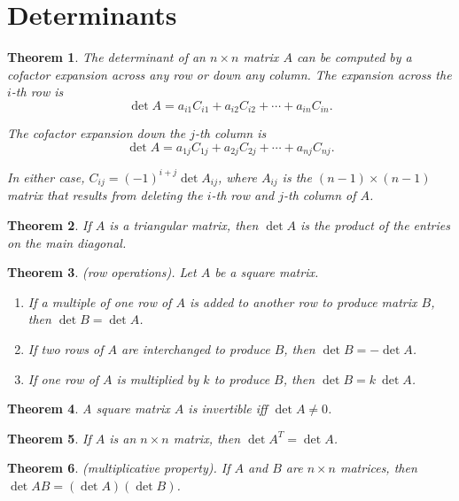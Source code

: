 \documentclass{article}
\theoremstyle{plain}
\newtheorem{thm}{Theorem}[section]
\theoremstyle{definition}
\theoremstyle{remark}
\begin{document}
\section{Determinants}

\begin{thm}
    The determinant of an \(n\times n\) matrix \(A\) can be computed by a cofactor expansion across any row or down any column. The expansion across the \(i\)-th row is 
    \[
        \det A=a_{i1}C_{i1}+a_{i2}C_{i2}+\cdots+a_{in}C_{in}.
    \] 
    
    The cofactor expansion down the \(j\)-th column is 
    \[
        \det A=a_{1j}C_{1j}+a_{2j}C_{2j}+\cdots+a_{nj}C_{nj}.
    \]

    In either case, \(C_{ij}=(-1)^{i+j}\det A_{ij}\), where \(A_{ij}\) is the \((n-1)\times(n-1)\) matrix that results from deleting the \(i\)-th row and \(j\)-th column of \(A\).
\end{thm}

\begin{thm}
    If \(A\) is a triangular matrix, then \(\det A\) is the product of the entries on the main diagonal.
\end{thm}

\begin{thm} (row operations).
    Let \(A\) be a square matrix.
    \begin{enumerate}
        \item[a.] If a multiple of one row of \(A\) is added to another row to produce matrix \(B\), then \(\det B=\det A\).
        \item[b.] If two rows of \(A\) are interchanged to produce \(B\), then \(\det B=-\det A\).
        \item[c.] If one row of \(A\) is multiplied by \(k\) to produce \(B\), then \(\det B=k\ \det A\).
    \end{enumerate}
\end{thm}

\begin{thm}
    A square matrix \(A\) is invertible iff \(\det A\neq0\).
\end{thm}

\begin{thm}
    If \(A\) is an \(n\times n\) matrix, then \(\det A^T=\det A\).
\end{thm}

\begin{thm} (multiplicative property).
    If \(A\) and \(B\) are \(n\times n\) matrices, then \(\det AB=\left(\det A\right)\left(\det B\right)\).
\end{thm}
\end{document}
